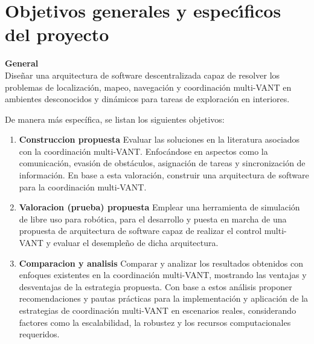 \documentclass[11pt,epsf,times]{article}
\begin{document}
\newpage
\section*{Objetivos generales y espec\'{\i}ficos del proyecto}

\textbf{General} \\

Dise\~{n}ar una arquitectura de software descentralizada capaz de resolver los problemas de localizaci\'{o}n, mapeo, navegaci\'{o}n y coordinaci\'{o}n multi-VANT en ambientes desconocidos y din\'{a}micos para tareas de exploraci\'{o}n en interiores.



\bigskip
\noindent
De manera m\'{a}s espec\'{i}fica, se listan los siguientes objetivos: %

\begin{enumerate}

\item \textbf{Construccion propuesta} Evaluar las soluciones en la literatura asociados con la coordinaci\'{o}n multi-VANT. Enfoc\'{a}ndose en aspectos como la comunicaci\'{o}n, evasi\'{o}n de obst\'{a}culos, asignaci\'{o}n de tareas y sincronizaci\'{o}n de informaci\'{o}n. En base a esta valoraci\'{o}n, construir una arquitectura de software para la coordinaci\'{o}n multi-VANT.

\item \textbf{Valoracion (prueba) propuesta} Emplear una herramienta de simulaci\'{o}n de libre uso para rob\'{o}tica, para el desarrollo y puesta en marcha de una propuesta de arquitectura de software capaz de realizar el control multi-VANT y evaluar el desemple\~{n}o de dicha arquitectura.
  
\item \textbf{Comparacion y analisis} Comparar y analizar los resultados obtenidos con enfoques existentes en la coordinaci\'{o}n multi-VANT, mostrando las ventajas y desventajas de la estrategia propuesta. Con base a estos an\'{a}lisis proponer recomendaciones y pautas pr\'{a}cticas para la implementaci\'{o}n y aplicaci\'{o}n de la estrategias de coordinaci\'{o}n multi-VANT en escenarios reales, considerando factores como la escalabilidad, la robustez y los recursos computacionales requeridos.

\end{enumerate}
\end{document}
